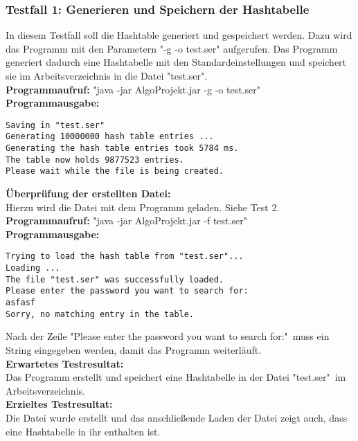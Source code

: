 \documentclass[11pt]{article}
\begin{document}
  \subsubsection{Testfall 1: Generieren und Speichern der Hashtabelle}
    In diesem Testfall soll die Hashtable generiert und gespeichert werden. Dazu wird das Programm mit den Parametern "-g -o test.ser" aufgerufen. Das Programm generiert dadurch eine Hashtabelle mit den Standardeinstellungen und speichert sie im Arbeitsverzeichnis in die Datei "test.ser".\\
    \textbf{Programmaufruf:} "java -jar AlgoProjekt.jar -g -o test.ser"\\
    \textbf{Programmausgabe:}
    \begin{verbatim}
Saving in "test.ser"
Generating 10000000 hash table entries ...
Generating the hash table entries took 5784 ms.
The table now holds 9877523 entries.
Please wait while the file is being created.
    \end{verbatim}
    \textbf{Überprüfung der erstellten Datei:}\\
    Hierzu wird die Datei mit dem Programm geladen. Siehe Test 2.\\
    \textbf{Programmaufruf:}
    "java -jar AlgoProjekt.jar -f test.ser"\\
 	\textbf{Programmausgabe:}
 	\begin{verbatim}
Trying to load the hash table from "test.ser"...
Loading ...
The file "test.ser" was successfully loaded.
Please enter the password you want to search for: 
asfasf
Sorry, no matching entry in the table.
 	\end{verbatim}
 	Nach der Zeile "Please enter the password you want to search for:"\
 	muss ein String eingegeben werden, damit das Programm weiterläuft.\\
 	\textbf{Erwartetes Testresultat:}\\
Das Programm erstellt und speichert eine Hashtabelle in der Datei "test.ser"\ im Arbeitsverzeichnis.\\
\textbf{Erzieltes Testresultat:}\\
Die Datei wurde erstellt und das anschließende Laden der Datei zeigt auch, dass eine Hashtabelle in ihr enthalten ist.
\end{document}
